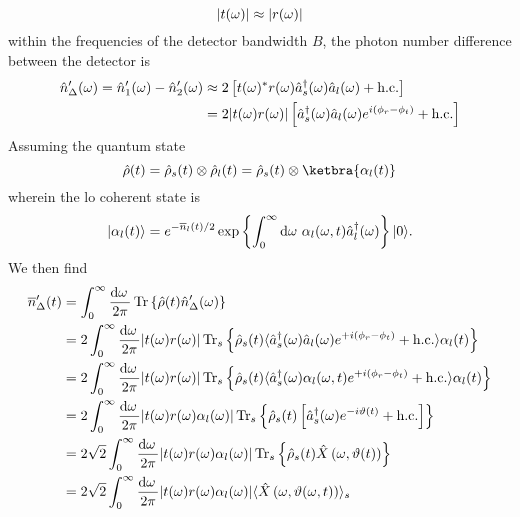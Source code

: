 \begin{equation}
	\lvert t(\omega)\rvert
	\approx
	\lvert r(\omega)\rvert
\end{equation}
within the frequencies of the detector bandwidth $B$, the photon number difference between the detector is
\begin{equation}
	\begin{split}
		\hat{n}^\prime_\Delta(\omega)
		=
		\hat{n}_1^\prime(\omega)
		-
		\hat{n}_2^\prime(\omega)
		&\approx
		2\left[
			t(\omega)^*
			r(\omega)
			\hat{a}_s^\dagger(\omega)
			\hat{a}_l(\omega)
			+
			\text{h.c.}
		\right]
		\\
		&=
		2\lvert t(\omega)r(\omega)\rvert
		\left[
			\hat{a}_s^\dagger(\omega)
			\hat{a}_l(\omega)
			e^{i(\phi_r-\phi_t)}
			+
			\text{h.c.}
		\right]
	\end{split}
\end{equation}
Assuming the quantum state~\cite[p.~213]{Vogel2006}
\begin{equation}
	\hat\rho(t)
	=
	\hat\rho_s(t)
	\otimes
	\hat\rho_l(t)
	=
	\hat\rho_s(t)
	\otimes
	\ketbra{\alpha_l(t)}
\end{equation}
wherein the \gls{lo} coherent state is
\begin{equation}
	\ket{\alpha_l(t)}
	=
	e^{-\overline{n}_l(t)/2}
	\exp\left\{
		\int_0^\infty\dd{\omega}
		\alpha_l(\omega,t)
		\hat{a}_l^\dagger(\omega)
	\right\}
	\ket{0}
	.
\end{equation}
We then find
\begin{equation}
	\begin{split}
		\overline{n}^\prime_\Delta(t)
		&=
		\int_0^\infty\frac{\dd{\omega}}{2\pi}
		\trace\left\{
			\hat\rho(t)
			\hat{n}_\Delta^\prime(\omega)
		\right\}
		\\
		&=
		2
		\int_0^\infty\frac{\dd{\omega}}{2\pi}
		\abs{t(\omega)r(\omega)}
		\trace_s\left\{
			\hat\rho_s(t)
			\expval{
				\hat{a}_s^\dagger(\omega)
				\hat{a}_l(\omega)
				e^{+i(\phi_r-\phi_t)}
				+
				\text{h.c.}
			}{\alpha_l(t)}
		\right\}
		\\
		&=
		2
		\int_0^\infty\frac{\dd{\omega}}{2\pi}
		\abs{t(\omega)r(\omega)}
		\trace_s\left\{
			\hat\rho_s(t)
			\expval{
				\hat{a}_s^\dagger(\omega)
				\alpha_l(\omega,t)
				e^{+i(\phi_r-\phi_t)}
				+
				\text{h.c.}
			}{\alpha_l(t)}
		\right\}
		\\
		&=
		2
		\int_0^\infty\frac{\dd{\omega}}{2\pi}
		\abs{t(\omega)r(\omega)\alpha_l(\omega)}
		\trace_s\left\{
			\hat\rho_s(t)
			\left[
				\hat{a}_s^\dagger(\omega)
				e^{-i\vartheta(t)}
				+
				\text{h.c.}
			\right]
		\right\}
		\\
		&=
		2\sqrt{2}
		\int_0^\infty\frac{\dd{\omega}}{2\pi}
		\abs{t(\omega)r(\omega)\alpha_l(\omega)}
		\trace_s\left\{
			\hat\rho_s(t)
			\hat{X}\left(\omega,\vartheta(t)\right)
		\right\}
		\\
		&=
		2\sqrt{2}
		\int_0^\infty\frac{\dd{\omega}}{2\pi}
		\abs{t(\omega)r(\omega)\alpha_l(\omega)}
		\expval{\hat{X}\left(\omega,\vartheta(\omega,t)\right)}_s
	\end{split}
\end{equation}
